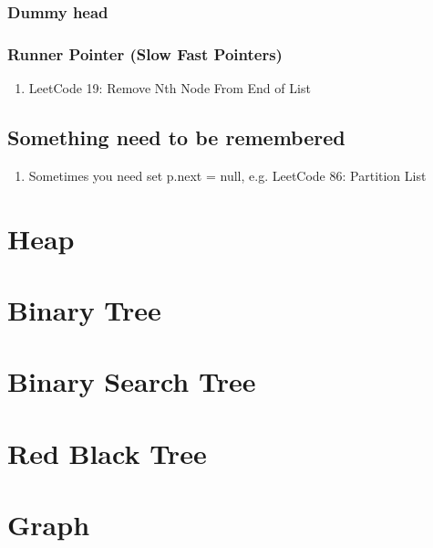 \subsection { Dummy head }


\subsection { Runner Pointer (Slow Fast Pointers)}
\begin{enumerate}
    \item LeetCode 19: Remove Nth Node From End of List


\end{enumerate}

\section{ Something need to be remembered  }

\begin{enumerate}
    \item Sometimes you need set p.next = null, e.g. LeetCode 86: Partition List


\end{enumerate}


\chapter{ Heap }

\chapter{ Binary Tree }

\chapter{ Binary Search Tree }

\chapter{ Red Black Tree }

\chapter{ Graph }


